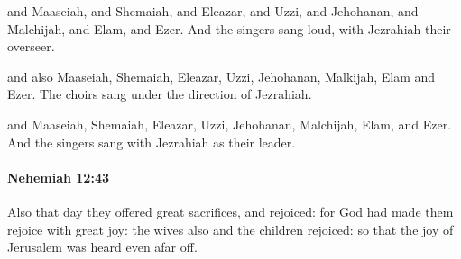 			\begin{versebox}
					\item[BHS] 
					\item[LXX] 
					\item[ASV] and Maaseiah, and Shemaiah, and Eleazar, and Uzzi, and Jehohanan, and Malchijah, and Elam, and Ezer. And the singers sang loud, with Jezrahiah their overseer.
					\item[NIV] and also Maaseiah, Shemaiah, Eleazar, Uzzi, Jehohanan, Malkijah, Elam and Ezer. The choirs sang under the direction of Jezrahiah.
					\item[NRSV] and Maaseiah, Shemaiah, Eleazar, Uzzi, Jehohanan, Malchijah, Elam, and Ezer. And the singers sang with Jezrahiah as their leader.
			\end{versebox}

		\paragraph{Nehemiah 12:43} %
			\label{NEHEMIAH-12-43}

			Also that day they offered great sacrifices, and rejoiced: for God had made them rejoice with great joy: the wives also and the children rejoiced: so that the joy of Jerusalem was heard even afar off.

